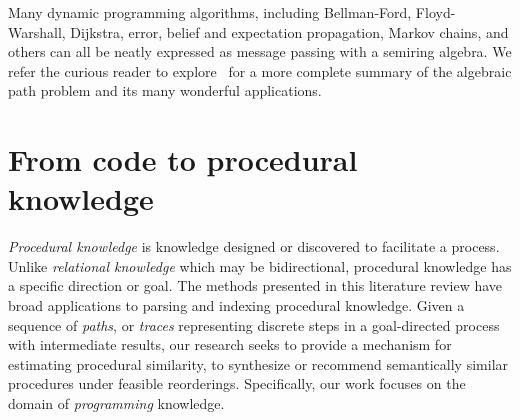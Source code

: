 \documentclass[11pt]{article}
\begin{document}
    \noindent Many dynamic programming algorithms, including Bellman-Ford, Floyd-Warshall, Dijkstra, error, belief and expectation propagation, Markov chains, and others can all be neatly expressed as message passing with a semiring algebra. We refer the curious reader to explore~\cite{gondran2008graphs,baras2010path} for a more complete summary of the algebraic path problem and its many wonderful applications.


%

    \pagebreak\section{From code to procedural knowledge}\label{sec:applications}

    \textit{Procedural knowledge} is knowledge designed or discovered to facilitate a process. Unlike \textit{relational knowledge} which may be bidirectional, procedural knowledge has a specific direction or goal. The methods presented in this literature review have broad applications to parsing and indexing procedural knowledge. Given a sequence of \textit{paths}, or \textit{traces} representing discrete steps in a goal-directed process with intermediate results, our research seeks to provide a mechanism for estimating procedural similarity, to synthesize or recommend semantically similar procedures under feasible reorderings. Specifically, our work focuses on the domain of \textit{programming} knowledge.
\end{document}
